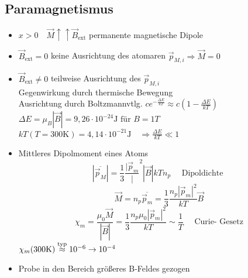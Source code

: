 \documentclass[titlepage,12pt,a4paper,ngerman]{report}
\newcommand{\tx}[1]{\textrm{#1}}
\begin{document}
\subsection{Paramagnetismus}
\begin{itemize}
	\item $ x>0 \quad \vec{M} \uparrow\uparrow \vec{B}_{\tx{ext}} $ permanente magnetische Dipole
	\item $ \vec{B}_{\tx{ext}} = 0 $ keine Ausrichtung des atomaren $ \vec{p}_{M,i} \Rightarrow \vec{M} = 0 $
	\item $ \vec{B}_{\tx{ext}} \neq 0 $ teilweise Ausrichtung des $ \vec{p}_{M,i} $\\
	Gegenwirkung durch thermische Bewegung\\
	Ausrichtung durch Boltzmannvtlg. $ c e^{-\frac{\Delta E}{kT}} \approx
	 c ( 1- \frac{\Delta E}{k T}) $\\
	 $  \Delta E = \mu_B |\vec{B}| = 9,26 \cdot 10 ^{-24} \tx{J für }  B = 1 T $\\
	 $ kT (T= 300 \tx{K}) = 4,14 \cdot 10^{-21} \tx{J} \quad \Rightarrow \frac{\Delta E}{kT} \ll 1$
	 \item  Mittleres Dipolmoment eines Atoms
	 $$| \overline{\vec{p}_M}| = \frac{1}{3} \frac{| \vec{p}_m}|^2 | \vec{B}|{k T}  n_p \quad \tx{ Dipoldichte }$$ 
	 $$\vec{M} = n_p \overline{\vec{p}_m} = \frac{1}{3} \frac{n_p | \vec{p}_m|^2}{kT} \vec{B}$$
	 $$ \boxed{\chi_m = \frac{\mu_0 \vec{M}}{|\vec{B}|} = \frac{1}{3} \frac{n_p \mu_0 | \vec{p}_m |^2}{kT} \sim \frac{1}{T}} \quad \tx{ Curie- Gesetz}$$
	 $\chi_m (300\tx{K}) \buildrel \tx{typ} \over \approx 10^{-6} \rightarrow 10 ^{-4}$
	 \item Probe in den Bereich größeres B-Feldes gezogen
\end{itemize}
\end{document}
